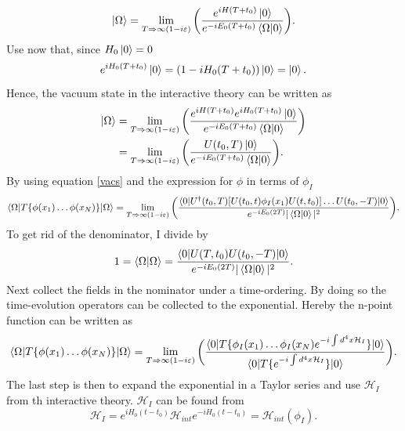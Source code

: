 \begin{equation}
	\ket{\Omega}=\lim\limits_{T\Rightarrow \infty (1-i\varepsilon)}\bigg(\frac{e^{iH(T+t_0)}\ket{0}}{e^{-iE_0(T+t_0)}\braket{\Omega|0}}\bigg).
\end{equation} 
Use now that, since $H_0\ket{0}=0$
\begin{equation}
	e^{iH_0(T+t_0)}\ket{0}=(1-iH_0(T+t_0))\ket{0}=\ket{0}.
\end{equation} 
Hence, the vacuum state in the interactive theory can be written as
\begin{equation}
	\begin{split}
		\ket{\Omega}&=\lim\limits_{T\Rightarrow \infty (1-i\varepsilon)}\bigg(\frac{e^{iH(T+t_0)}e^{iH_0(T+t_0)}\ket{0}}{e^{-iE_0(T+t_0)}\braket{\Omega|0}}\bigg)\\
		&=\lim\limits_{T\Rightarrow \infty (1-i\varepsilon)}\bigg(\frac{U(t_0,T)\ket{0}}{e^{-iE_0(T+t_0)}\braket{\Omega|0}}\bigg).\\
	\end{split}
	\label{vacs}
\end{equation} 
By using equation \eqref{vacs} and the expression for $\phi$ in terms of $\phi_I$
\begin{equation}
	\braket{\Omega|T\{\phi(x_1)\dots \phi(x_N)\}|\Omega}=\lim\limits_{T\Rightarrow \infty (1-i\varepsilon)}\bigg(\frac{\braket{0|U^\dagger(t_0,T)[U(t_0,t)\phi_I(x_1)U(t,t_0)]\dots U(t_0,-T)|0}}{e^{-iE_0(2T)}|\braket{\Omega|0}|^2}\bigg).
\end{equation} 
To get rid of the denominator, I divide by
\begin{equation}
	1=\braket{\Omega|\Omega}=\frac{\braket{0|U(T,t_0)U(t_0,-T)|0}}{e^{-iE_0(2T)}|\braket{\Omega|0}|^2}.
\end{equation} 
Next collect the fields in the nominator under a time-ordering. By doing so the time-evolution operators can be collected to the exponential. Hereby the n-point function can be written as
\begin{equation}
	\braket{\Omega|T\{\phi(x_1)\dots \phi(x_N)\}|\Omega}=\lim\limits_{T\Rightarrow \infty (1-i\varepsilon)}\bigg(\frac{\braket{0|T\{\phi_I(x_1)\dots\phi_I(x_N)e^{-i\int d^4x \mathcal{H}_I}\}|0}}{\braket{0|T\{e^{-i\int d^4x \mathcal{H}_I}\}|0}}\bigg).
	\label{pert}
\end{equation} 
The last step is then to expand the exponential in a Taylor series and use $\mathcal{H}_I$ from th interactive theory. $\mathcal{H}_I$ can be found from
\begin{equation}
	\mathcal{H}_I=e^{iH_0(t-t_0)}\mathcal{H}_{int}e^{-iH_0(t-t_0)}=\mathcal{H}_{int}(\phi_I).
\end{equation} 
